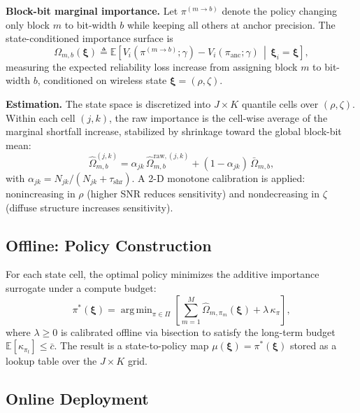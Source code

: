 \documentclass[conference]{IEEEtran}
\DeclareMathOperator*{\argmin}{arg\,min}
\newcommand{\E}{\mathbb{E}}
\newcommand{\Given}{\,\middle|\,}
\begin{document}
\textbf{Block-bit marginal importance.}
Let $\pi^{(m\to b)}$ denote the policy changing only block $m$ to bit-width $b$ while keeping all others at anchor precision.
The state-conditioned importance surface is
\begin{equation}
\Omega_{m,b}(\boldsymbol{\xi}) \triangleq \E\!\left[
V_i(\pi^{(m\to b)};\gamma) - V_i(\pi_{\mathrm{anc}};\gamma)
\Given \boldsymbol{\xi}_i = \boldsymbol{\xi}
\right],
\label{eq:importance_surface}
\end{equation}
measuring the expected reliability loss increase from assigning block $m$ to bit-width $b$, conditioned on wireless state $\boldsymbol{\xi}=(\rho,\zeta)$.

\textbf{Estimation.}
The state space is discretized into $J\times K$ quantile cells over $(\rho,\zeta)$.
Within each cell $(j,k)$, the raw importance is the cell-wise average of the marginal shortfall increase, stabilized by shrinkage toward the global block-bit mean:
\begin{equation}
\widehat{\Omega}_{m,b}^{(j,k)} = \alpha_{jk}\,\widehat{\Omega}_{m,b}^{\mathrm{raw},(j,k)} + (1-\alpha_{jk})\,\bar{\Omega}_{m,b},
\label{eq:shrinkage}
\end{equation}
with $\alpha_{jk}=N_{jk}/(N_{jk}+\tau_{\mathrm{shr}})$.
A 2-D monotone calibration is applied: nonincreasing in $\rho$ (higher SNR reduces sensitivity) and nondecreasing in $\zeta$ (diffuse structure increases sensitivity).

\subsection{Offline: Policy Construction}
\label{subsec:policy_construction}

For each state cell, the optimal policy minimizes the additive importance surrogate under a compute budget:
\begin{equation}
\pi^*(\boldsymbol{\xi}) = \argmin_{\pi\in\Pi}\left[
\sum_{m=1}^{M} \widehat{\Omega}_{m,\pi_m}(\boldsymbol{\xi}) + \lambda\,\kappa_\pi
\right],
\label{eq:policy_opt}
\end{equation}
where $\lambda\ge 0$ is calibrated offline via bisection to satisfy the long-term budget $\E[\kappa_{\pi_t}]\le\bar{c}$.
The result is a state-to-policy map $\mu(\boldsymbol{\xi})=\pi^*(\boldsymbol{\xi})$ stored as a lookup table over the $J\times K$ grid.

\subsection{Online Deployment}
\label{subsec:online}
\end{document}
